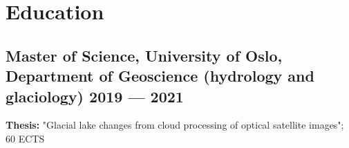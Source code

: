 \documentclass[a4,10pt]{article}
\newenvironment{zitemize}{
\begin{itemize}\itemsep2pt \parskip0pt \parsep1pt}
{\end{itemize}\vspace{-0.5cm}}
\begin{document}
%

\section{Education }
\subsection*{Master of Science, {\normalsize \normalfont University of Oslo, Department of Geoscience (hydrology and glaciology)} \hfill 2019 --- 2021} 
\textbf{Thesis:} "Glacial lake changes from cloud processing of optical satellite images"; 60 ECTS
\vspace{0.1cm}
\end{document}
